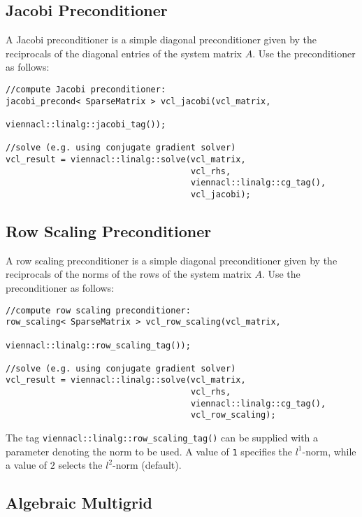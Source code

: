 \subsection{Jacobi Preconditioner}
A Jacobi preconditioner is a simple diagonal preconditioner given by the reciprocals of the diagonal entries of the system matrix $A$.
Use the preconditioner as follows:
\begin{lstlisting}
//compute Jacobi preconditioner:
jacobi_precond< SparseMatrix > vcl_jacobi(vcl_matrix,
                                          viennacl::linalg::jacobi_tag());

//solve (e.g. using conjugate gradient solver)
vcl_result = viennacl::linalg::solve(vcl_matrix,
                                     vcl_rhs,
                                     viennacl::linalg::cg_tag(),
                                     vcl_jacobi);
\end{lstlisting}


\subsection{Row Scaling Preconditioner}
A row scaling preconditioner is a simple diagonal preconditioner given by the reciprocals of the norms of the rows of the system matrix $A$.
Use the preconditioner as follows:
\begin{lstlisting}
//compute row scaling preconditioner:
row_scaling< SparseMatrix > vcl_row_scaling(vcl_matrix,
                                      viennacl::linalg::row_scaling_tag());

//solve (e.g. using conjugate gradient solver)
vcl_result = viennacl::linalg::solve(vcl_matrix,
                                     vcl_rhs,
                                     viennacl::linalg::cg_tag(),
                                     vcl_row_scaling);
\end{lstlisting}
The tag \lstinline|viennacl::linalg::row_scaling_tag()| can be supplied with a parameter denoting the norm to be used. A value of \lstinline|1| specifies the
$l^1$-norm, while a value of $2$ selects the $l^2$-norm (default).

\subsection{Algebraic Multigrid}

